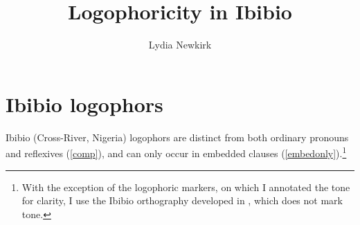 \documentclass[output=paper]{langscibook}
\author{Lydia Newkirk\affiliation{Rutgers University}}
\title{Logophoricity in Ibibio}
\begin{document}
  




\section{Ibibio logophors}

Ibibio (Cross-River, Nigeria) logophors are distinct from both ordinary pronouns and reflexives (\ref{comp}), and can only occur in embedded clauses (\ref{embedonly}).\footnote{With the exception of the logophoric markers, on which I annotated the tone for clarity, I use the Ibibio orthography developed in \citet{Essien1990}, which does not mark tone.}
\end{document}
